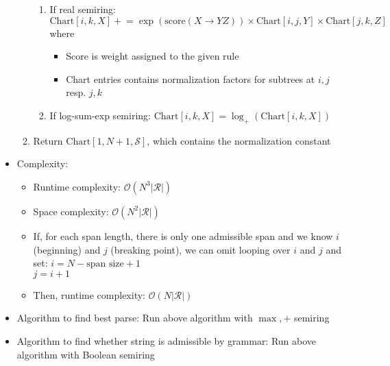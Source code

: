 \begin{itemize}
\begin{enumerate}
        \begin{enumerate}
            \item If real semiring: $\textrm{Chart}[i, k, X] \mathrel{+}= \exp(\textrm{score}(X \to Y Z)) \times \textrm{Chart}[i, j, Y] \times \textrm{Chart}[j, k, Z]$ where
            \begin{itemize}
                \item Score is weight assigned to the given rule
                \item Chart entries contains normalization factors for subtrees at $i,j$ resp. $j,k$
            \end{itemize}
            \item If log-sum-exp semiring: $
            \textrm{Chart}[i, k, X] = \log_+( \textrm{Chart}[i, k, X])
            $
        \end{enumerate}
        \item Return $\textrm{Chart}[1, N+1, \mathcal{S}]$, which contains the normalization constant
    \end{enumerate}
    \item Complexity:
    \begin{itemize}
        \item Runtime complexity: $\mathcal{O}(N^3 |\mathcal{R}|)$
        \item Space complexity: $\mathcal{O}(N^2 |\mathcal{R}|)$
        \item If, for each span length, there is only one admissible span and we know $i$ (beginning) and $j$ (breaking point), we can omit looping over $i$ and $j$ and set:
        $i = N - \textrm{span size} + 1$\\
        $j = i + 1$
        \item Then, runtime complexity: $\mathcal{O}(N |\mathcal{R}|)$
    \end{itemize}
    \item Algorithm to find best parse: Run above algorithm with $\max, +$ semiring
    \item Algorithm to find whether string is admissible by grammar: Run above algorithm with Boolean semiring
\end{itemize}